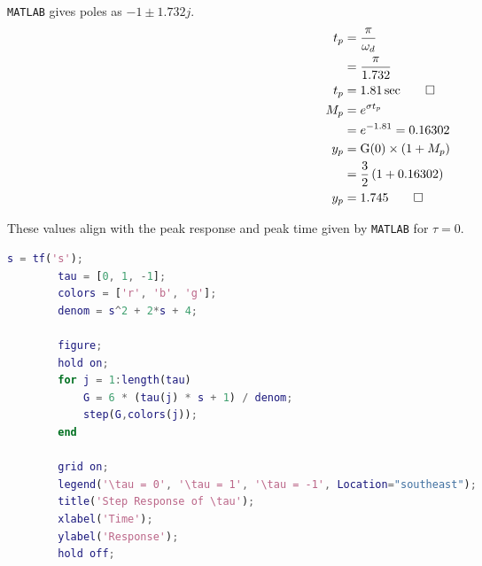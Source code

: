 \begin{hwkProblem}{1}{}
	\lstinline{MATLAB} gives poles as \( -1 \pm 1.732j \).
	\begin{align*}
		t_{p} &= \frac{\pi}{\omega_{d}} \\
		      &= \frac{\pi}{1.732} \\
		t_{p} &= \qty{1.81}{\sec} \qed \\
		M_{p} &= e^{\sigma t_{p}} \\
		      &= e^{-1.81} = 0.16302 \\
		y_{p} &= \func{G}[0] \times \left(1+M_{p}\right) \\
		      &= \frac{3}{2} \left(1 + 0.16302\right) \\
		y_{p} &= 1.745 \qed
	\end{align*}
	
	These values align with the peak response and peak time given by \lstinline{MATLAB} for \( \tau = 0 \).

	\hwkCode{}

	\begin{lstlisting}[language={matlab}, label={lst:s01}, caption={\lstinline{MATLAB} code for P01}]
		s = tf('s');
		tau = [0, 1, -1];
		colors = ['r', 'b', 'g'];
		denom = s^2 + 2*s + 4;

		figure;
		hold on;
		for j = 1:length(tau)
			G = 6 * (tau(j) * s + 1) / denom;
			step(G,colors(j));
		end

		grid on;
		legend('\tau = 0', '\tau = 1', '\tau = -1', Location="southeast");
		title('Step Response of \tau');
		xlabel('Time');
		ylabel('Response');
		hold off;
	\end{lstlisting}

\end{hwkProblem}

